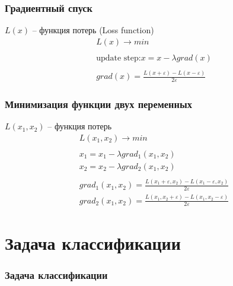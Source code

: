 \documentclass[fullscreen=true, bookmarks=false]{beamer} %
\begin{document}

\begin{frame}{}
 \frametitle{Градиентный спуск}
$L(x)$ -- функция потерь (Loss function) 
\begin{gather*}
\nonumber
L(x) \rightarrow min\\
\nonumber\\
\nonumber
\text{update step:} x = x - \lambda grad(x)\\
\nonumber\\
\nonumber
grad(x) = \frac{L(x+\varepsilon) - L(x - \varepsilon)}{2\varepsilon}
\end{gather*}

\end{frame}


\begin{frame}{}
 \frametitle{Минимизация функции двух переменных}
$L(x_1, x_2)$ -- функция потерь 
\begin{gather*}
\nonumber
L(x_1, x_2) \rightarrow min\\
\nonumber\\
\nonumber
x_1 = x_1 - \lambda grad_1(x_1, x_2)\\
\nonumber
x_2 = x_2 - \lambda grad_2(x_1, x_2)\\
\nonumber\\
\nonumber
grad_1(x_1, x_2) = \frac{L(x_1+\varepsilon, x_2) - L(x_1 - \varepsilon, x_2)}{2\varepsilon}\\
\nonumber
grad_2(x_1, x_2) = \frac{L(x_1, x_2+\varepsilon) - L(x_1 , x_2 - \varepsilon)}{2\varepsilon}
\end{gather*}

\end{frame}


\section{Задача классификации}


\begin{frame}{}
 \frametitle{Задача классификации}

\end{frame}
\end{document}
